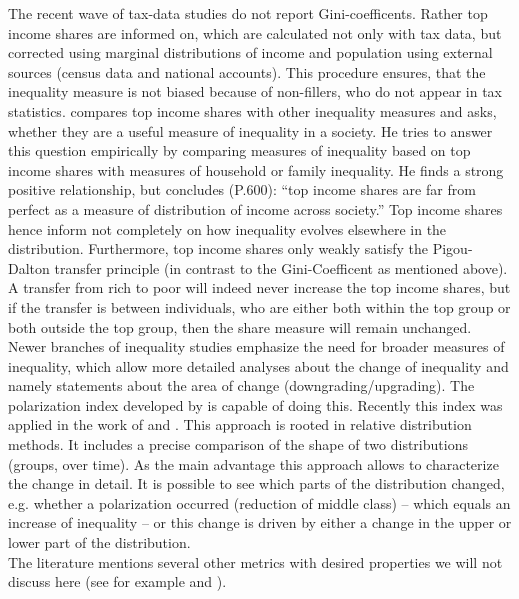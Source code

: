 \documentclass[twoside]{article}\usepackage[]{graphicx}\usepackage[]{color}
\begin{document}
\begin{multicols}{2}
The recent wave of tax-data studies do not report Gini-coefficents. Rather top income shares are informed on, which are calculated not only with tax data, but corrected using marginal distributions of income and population using external sources (census data and national accounts). This procedure ensures, that the inequality measure is not biased because of non-fillers, who do not appear in tax statistics.  \citet{leigh_how_2007} compares top income shares with other inequality measures and asks, whether they are a useful measure of inequality in a society. He tries to answer this question empirically by comparing measures of inequality based on top income shares with measures of household or family inequality. He finds a strong positive relationship, but concludes (P.600): ``top income shares are far from perfect as a measure of distribution of income across society.'' Top income shares hence inform not completely on how inequality evolves elsewhere in the distribution. Furthermore, top income shares only weakly satisfy the Pigou-Dalton transfer principle (in contrast to the Gini-Coefficent as mentioned above). A transfer from rich to poor will indeed never increase the top income shares, but if the transfer is between individuals, who are either both within the top group or both outside the top group, then the share measure will remain unchanged. \\


Newer branches of inequality studies emphasize the need for broader measures of inequality, which allow more detailed analyses about the change of inequality and namely statements about the area of change (downgrading/upgrading). The polarization index developed by \citep{handcock_relative_1999} is capable of doing this. Recently this index was applied in the work of \citep{alderson_exactly_2005} and \citep{gornick_how_2013}. This approach is rooted in relative distribution methods. It includes a precise comparison of the shape of two distributions (groups, over time). As the main advantage this approach allows to characterize the change in detail. It is possible to see which parts of the distribution changed, e.g. whether a polarization occurred (reduction of middle class) -- which equals an increase of inequality -- or this change is driven by either a change in the upper or lower part of the distribution.  \\
 
The literature mentions several other metrics with desired properties we will not discuss here (see for example \citet{cowell_chapter_2000} and \citet{hao_assessing_2010}).\\


\end{multicols}
\end{document}
